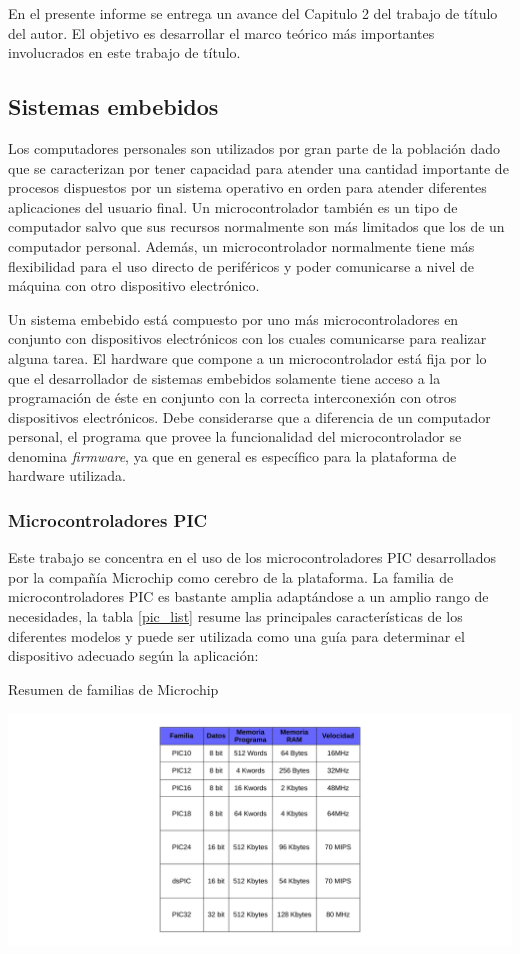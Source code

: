 \documentclass[11pt,letterpaper]{article}
\begin{document}
En el presente informe se entrega un avance del Capitulo 2 del trabajo de título del autor. El objetivo es desarrollar el marco teórico más importantes involucrados en este trabajo de título.

\subsection{Sistemas embebidos}
Los computadores personales son utilizados por gran parte de la población dado que se caracterizan por tener capacidad para atender una cantidad importante de procesos dispuestos por un sistema operativo en orden para atender diferentes aplicaciones  del usuario final. Un microcontrolador tambi\'en es un tipo de computador salvo que sus recursos normalmente son más limitados que los de un computador personal. Además, un microcontrolador normalmente tiene más flexibilidad para el uso directo de perif\'ericos y poder comunicarse a nivel de máquina con otro dispositivo electrónico.

Un sistema embebido está compuesto por uno más microcontroladores en conjunto con dispositivos electrónicos con los cuales comunicarse para realizar alguna tarea. 
El hardware que compone a un microcontrolador está fija por lo que el desarrollador de sistemas embebidos solamente tiene acceso a la programación de \'este en conjunto con la correcta interconexión con otros dispositivos electrónicos. Debe considerarse que a diferencia de un computador personal, el programa que provee la funcionalidad del microcontrolador se denomina \textit{firmware}, ya que en general es específico para la plataforma de hardware utilizada.

\subsubsection{Microcontroladores PIC}
Este trabajo se concentra en el uso de los microcontroladores PIC desarrollados por la compañía Microchip como cerebro de la plataforma. La familia de microcontroladores  PIC es bastante amplia adaptándose a un amplio rango de necesidades, la tabla \ref{pic_list} resume las principales características de los diferentes modelos y puede ser utilizada como una guía para determinar el dispositivo adecuado según la aplicación:

\begin{table}[ht!]
\caption{Resumen de familias de Microchip}\label{pic_list}
\centering \includegraphics[width=\textwidth]{img/pic_list.pdf}
\end{table}
\end{document}
